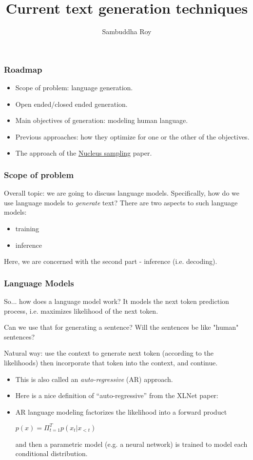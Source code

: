 \documentclass[11pt]{beamer}
\title[Microsoft, March 27, 2020] %
{Current text generation techniques}
\author{Sambuddha Roy}
\begin{document}
\begin{frame}
  \titlepage
\end{frame}

\begin{frame}
  \frametitle{Roadmap}
\begin{itemize}
  \item Scope of problem: language generation.
  \item Open ended/closed ended generation.
  \item Main objectives of generation: modeling human language.
  \item Previous approaches: how they optimize for one or the other of the objectives.
  \item The approach of the \href{https://arxiv.org/pdf/1904.09751.pdf}{Nucleus sampling} paper.
\end{itemize}
\end{frame}


\begin{frame}
  \frametitle{Scope of problem}
Overall topic: we are going to discuss language models. Specifically, how do we
use language models to {\em generate} text? There are two aspects to such language models:
\begin{itemize}
  \item training
  \item inference
\end{itemize}
Here, we are concerned with the second part - inference (i.e. decoding).
\end{frame}

\begin{frame}
  \frametitle{Language Models}
So... how does a language model work?
It models the next token prediction process, i.e. maximizes likelihood of the next token.

Can we use that for generating a sentence? Will the sentences be like "human" sentences?

Natural way: use the context to generate next token (according to the likelihoods) then
incorporate that token into the context, and continue.
\end{frame}

\begin{frame}
\begin{itemize}
  \item This is also called an {\em auto-regressive} (AR) approach.
  \item Here is a nice definition of ``auto-regressive'' from the XLNet paper:
  \item AR language modeling factorizes the likelihood into a forward product
\begin{center}
$p(x) = \Pi_{t=1}^T p(x_t | x_{<t})$
\end{center}
and then a parametric model (e.g. a neural network) is trained to model each
conditional distribution.
\end{itemize}
\end{frame}
\end{document}
